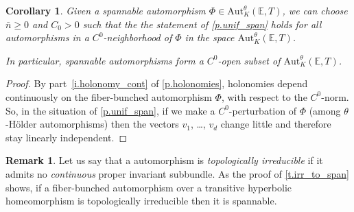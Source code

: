 \documentclass[JEP,XML,SOM,Unicode]{cedram}
\theoremstyle{plain}
\newtheorem{corollary}[theorem]{Corollary}
\theoremstyle{definition}
\newtheorem{remark}[theorem]{Remark}
\newcommand{\EE}{\mathbb{E}}
\newcommand{\Aut}{\mathrm{Aut}}
\begin{document}
\begin{corollary}\label{c.open_span}
Given a spannable automorphism $\Phi \in \Aut^\theta_K(\EE,T)$, we can choose $\bar{n} \ge 0$ and $C_0 > 0$ such that the the statement of \cref{p.unif_span} holds for all automorphisms in a $C^0$-neighborhood of $\Phi$ in the space $\Aut^\theta_K(\EE,T)$.

In particular, spannable automorphisms form a $C^0$-open subset of $\Aut^\theta_K(\EE,T)$.
\end{corollary}

\begin{proof}
By part~\eqref{i.holonomy_cont} of \cref{p.holonomies}, holonomies depend continuously on the fiber-bunched automorphism $\Phi$, with respect to the $C^0$-norm.
So, in the situation of \cref{p.unif_span}, if we make a $C^0$-perturbation of $\Phi$ (among $\theta$-Hölder automorphisms) then the vectors $v_1$, \dots, $v_d$ change little and therefore stay linearly independent.
\end{proof}

\begin{remark}
Let us say that a automorphism is \emph{topologically irreducible} if it admits no \emph{continuous} proper invariant subbundle. As the proof of \cref{t.irr_to_span} shows, if a fiber-bunched automorphism over a transitive hyperbolic homeomorphism is topologically irreducible then it is spannable.
\end{remark}
\end{document}
